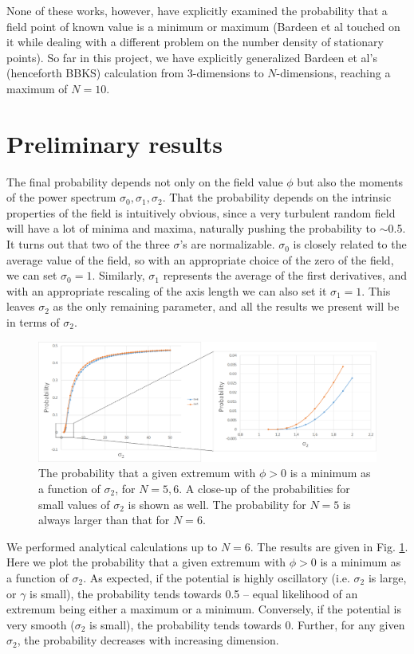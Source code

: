 \documentclass[12pt]{article}
\begin{document}
None of these works, however, have explicitly examined the probability that a field point of known value is a minimum or maximum (Bardeen et al\cite{BBKS} touched on it while dealing with a different problem on the number density of stationary points). So far in this project, we have explicitly generalized Bardeen et al's (henceforth BBKS) calculation from 3-dimensions to $N$-dimensions, reaching a maximum of $N=10$.

\section{Preliminary results}
The final probability depends not only on the field value $\phi$ but also the moments of the power spectrum $\sigma_0, \sigma_1, \sigma_2$. That the probability depends on the intrinsic properties of the field is intuitively obvious, since a very turbulent random field will have a lot of minima and maxima, naturally pushing the probability to $\sim$0.5. It turns out that two of the three $\sigma$'s are normalizable. $\sigma_0$ is closely related to the average value of the field, so with an appropriate choice of the zero of the field, we can set $\sigma_0 = 1$. Similarly, $\sigma_1$ represents the average of the first derivatives, and with an appropriate rescaling of the axis length we can also set it $\sigma_1 = 1$. This leaves $\sigma_2$ as the only remaining parameter, and all the results we present will be in terms of $\sigma_2$.

\begin{figure}
  \centering
  \includegraphics[width=\linewidth]{N6minima.png}
  \caption{The probability that a given extremum with $\phi > 0$ is a minimum as a function of $\sigma_2$, for $N=5,6$. A close-up of the probabilities for small values of $\sigma_2$ is shown as well. The probability for $N=5$ is always larger than that for $N=6$.}
  \label{N6}
\end{figure}

We performed analytical calculations up to $N=6$. The results are given in Fig. \ref{N6}. Here we plot the probability that a given extremum with $\phi > 0$ is a minimum as a function of $\sigma_2$. As expected, if the potential is highly oscillatory (i.e. $\sigma_2$ is large, or $\gamma$ is small), the probability tends towards 0.5 -- equal likelihood of an extremum being either a maximum or a minimum. Conversely, if the potential is very smooth ($\sigma_2$ is small), the probability tends towards 0. Further, for any given $\sigma_2$, the probability decreases with increasing dimension.
\end{document}
